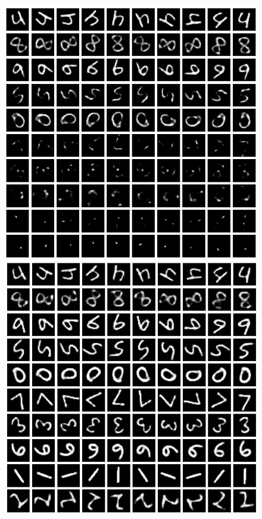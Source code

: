 \documentclass[12pt]{article}
\begin{document}
\begin{figure}[h!]
\begin{minipage}{0.32\textwidth}
			\includegraphics[scale=0.22]{rotatingMNIST_VAElat}
		\end{minipage}
		\begin{minipage}{0.32\textwidth}
				\includegraphics[scale=0.22]{rotatingMNIST_VAElat2}
		\end{minipage}


\end{figure}
\end{document}
